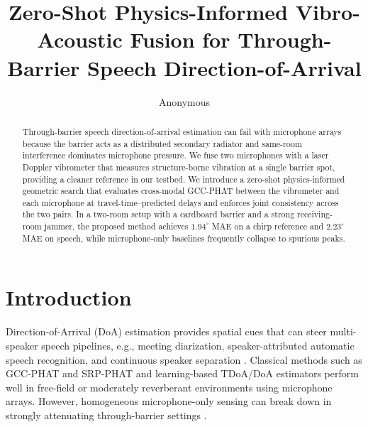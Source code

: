 \documentclass{Interspeech}
\title{Zero-Shot Physics-Informed Vibro-Acoustic Fusion for Through-Barrier Speech Direction-of-Arrival}
\author[affiliation={1}]{Anonymous}{Author}
\begin{document}
\setlength{\abovedisplayskip}{3pt}
\setlength{\belowdisplayskip}{3pt}
\setlength{\textfloatsep}{10pt}
\setlength{\floatsep}{10pt}
\setlength{\intextsep}{10pt}
\maketitle

\begin{abstract}
Through-barrier speech direction-of-arrival estimation can fail with microphone arrays because the barrier acts as a distributed secondary radiator and same-room interference dominates microphone pressure. We fuse two microphones with a laser Doppler vibrometer that measures structure-borne vibration at a single barrier spot, providing a cleaner reference in our testbed. We introduce a zero-shot physics-informed geometric search that evaluates cross-modal GCC-PHAT between the vibrometer and each microphone at travel-time--predicted delays and enforces joint consistency across the two pairs. In a two-room setup with a cardboard barrier and a strong receiving-room jammer, the proposed method achieves $1.94^\circ$ MAE on a chirp reference and $2.23^\circ$ MAE on speech, while microphone-only baselines frequently collapse to spurious peaks.
\end{abstract}

\section{Introduction}
\label{sec:intro}

Direction-of-Arrival (DoA) estimation provides spatial cues that can steer multi-speaker speech pipelines, e.g., meeting diarization, speaker-attributed automatic speech recognition, and continuous speaker separation \cite{wang2021realtime_diar, mariotte2024asobo, taherian2024ssnd, park2024cssloc, shi2024spatial_ltmask}. Classical methods such as GCC-PHAT and SRP-PHAT \cite{knapp1976gcc, dibiase2001robust} and learning-based TDoA/DoA estimators \cite{sun2024msdet, berg2022shiftgcc, salvati2021pgccphat, shmuel2023deep, zhang2024robust} perform well in free-field or moderately reverberant environments using microphone arrays. However, homogeneous microphone-only sensing can break down in strongly attenuating through-barrier settings \cite{remillieux2009ldv, wang2024physics}.
\end{document}
